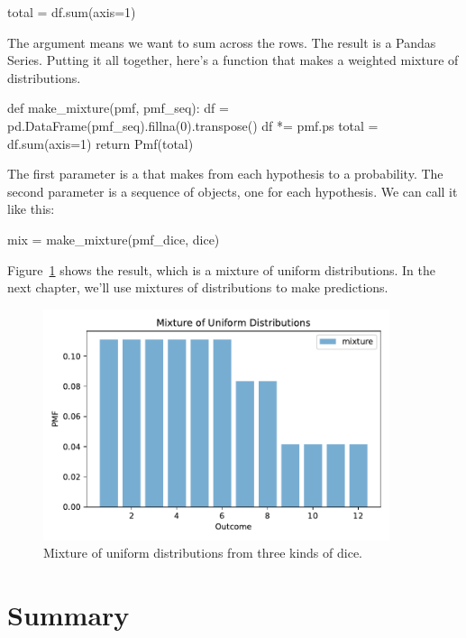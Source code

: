 \documentclass[12pt]{book}
\theoremstyle{exercise}
\begin{document}
\begin{code}
total = df.sum(axis=1)
\end{code}

The argument  means we want to sum across the rows.
The result is a Pandas Series.
Putting it all together, here's a function that makes a weighted mixture of distributions.

\begin{code}
def make_mixture(pmf, pmf_seq):
    df = pd.DataFrame(pmf_seq).fillna(0).transpose()
    df *= pmf.ps
    total = df.sum(axis=1)
    return Pmf(total)
\end{code}


The first parameter is a  that makes from each hypothesis to a probability.
The second parameter is a sequence of  objects, one for each hypothesis.
We can call it like this:

\begin{code}
mix = make_mixture(pmf_dice, dice)
\end{code}

Figure~\ref{fig06-04} shows the result, which is a mixture of uniform distributions.
In the next chapter, we'll use mixtures of distributions to make predictions.

\begin{figure}
\centerline{\includegraphics[width=4in]{figs/fig06-04.pdf}}
\caption{Mixture of uniform distributions from three kinds of dice.}
\label{fig06-04}
\end{figure}





\section{Summary}
\end{document}
